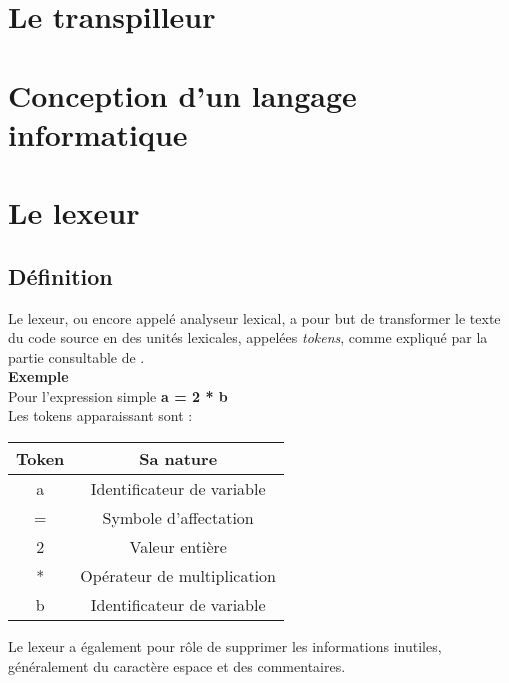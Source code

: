 \documentclass[a4paper]{article}%
\begin{document}
\section{Le transpilleur}

\section{Conception d'un langage informatique}


\section{Le lexeur}

\subsection{Définition}

Le lexeur, ou encore appelé analyseur lexical, a pour but de transformer le
texte du code source en des unités lexicales, appelées \textit{tokens}, comme
expliqué par la partie consultable de  \cite{flexBisonHandbook}. \\

\textbf{Exemple} \\
    Pour l'expression simple \textbf{a = 2 * b} \\
    Les tokens apparaissant sont : \\
    \begin{center}
    \begin{tabular}{ | c | c | }
    \hline
    \textbf{Token} & \textbf{Sa nature} \\
    \hline
    a & Identificateur de variable \\
    \hline
    = & Symbole d'affectation \\
    \hline
    2 & Valeur entière \\
    \hline
    * & Opérateur de multiplication \\
    \hline
    b & Identificateur de variable \\
    \hline
\end{tabular}
\end{center}

Le lexeur a également pour rôle de supprimer les informations inutiles,
généralement du caractère espace et des commentaires.\\~\\%
\end{document}
